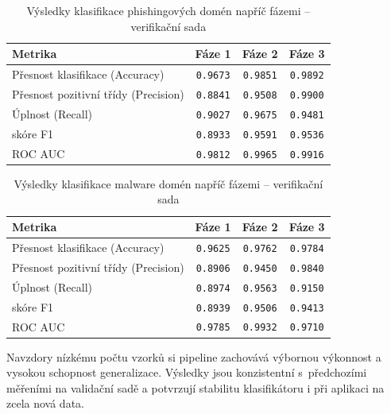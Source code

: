 \begin{table}[H]
\centering
\begin{tabular}{|l|c|c|c|}
\hline
\textbf{Metrika} & \textbf{Fáze 1} & \textbf{Fáze 2} & \textbf{Fáze 3} \\
\hline
Přesnost klasifikace (Accuracy)     & \texttt{0.9673} & \texttt{0.9851} & \texttt{0.9892} \\
Přesnost pozitivní třídy (Precision)    & \texttt{0.8841} & \texttt{0.9508} & \texttt{0.9900} \\
Úplnost (Recall)       & \texttt{0.9027} & \texttt{0.9675} & \texttt{0.9481} \\
skóre F1                & \texttt{0.8933} & \texttt{0.9591} & \texttt{0.9536} \\
ROC AUC                 & \texttt{0.9812} & \texttt{0.9965} & \texttt{0.9916} \\
\hline
\end{tabular}
\caption{Výsledky klasifikace phishingových domén napříč fázemi – verifikační sada}
\label{tab:phishing_stages_ver}
\end{table}

\begin{table}[H]
\centering
\begin{tabular}{|l|c|c|c|}
\hline
\textbf{Metrika} & \textbf{Fáze 1} & \textbf{Fáze 2} & \textbf{Fáze 3} \\
\hline
Přesnost klasifikace (Accuracy)     & \texttt{0.9625} & \texttt{0.9762} & \texttt{0.9784} \\
Přesnost pozitivní třídy (Precision)    & \texttt{0.8906} & \texttt{0.9450} & \texttt{0.9840} \\
Úplnost (Recall)       & \texttt{0.8974} & \texttt{0.9563} & \texttt{0.9150} \\
skóre F1                & \texttt{0.8939} & \texttt{0.9506} & \texttt{0.9413} \\
ROC AUC                 & \texttt{0.9785} & \texttt{0.9932} & \texttt{0.9710} \\
\hline
\end{tabular}
\caption{Výsledky klasifikace malware domén napříč fázemi – verifikační sada}
\label{tab:malware_stages_ver}
\end{table}


Navzdory nízkému počtu vzorků si pipeline zachovává výbornou výkonnost a vysokou schopnost generalizace. Výsledky jsou konzistentní s~předchozími měřeními na validační sadě a potvrzují stabilitu klasifikátoru i při aplikaci na zcela nová data.



